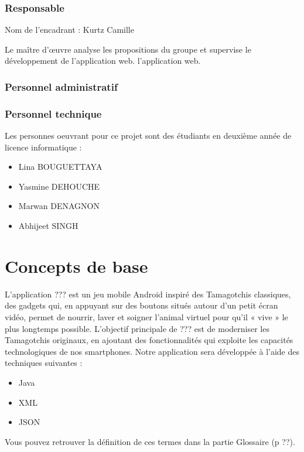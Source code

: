 \documentclass{rapportECL}
\begin{document}
\subsubsection{Responsable}
Nom de l'encadrant : Kurtz Camille 

Le maître d’œuvre analyse les propositions du groupe et supervise le développement de l'application web.
l'application web.
\subsubsection{Personnel administratif}
\subsubsection{Personnel technique}
Les personnes oeuvrant pour ce projet sont des étudiants en deuxième année de licence informatique :
\begin{itemize}[label=\textbullet]
\item Lina BOUGUETTAYA 
\item Yasmine DEHOUCHE
\item Marwan DENAGNON 
\item Abhijeet SINGH
\end{itemize}
\section{Concepts de base}
L’application ??? est un jeu mobile Android inspiré des Tamagotchis classiques, des gadgets qui, en appuyant sur des boutons situés autour d'un petit écran vidéo, permet de nourrir, laver et soigner l'animal virtuel pour qu'il « vive » le plus longtemps possible. L’objectif principale de ??? est de moderniser les Tamagotchis originaux, en ajoutant des fonctionnalités qui exploite les capacités technologiques de nos smartphones. Notre application sera développée à l’aide des techniques suivantes :
\begin{itemize}[label=\textbullet]
\item Java
\item XML
\item JSON
\end{itemize}
Vous pouvez retrouver la définition de ces termes dans la partie Glossaire (p ??).
\end{document}
